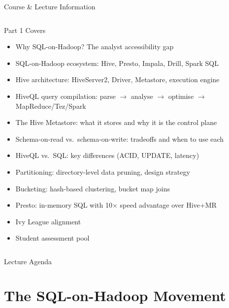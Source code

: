 \documentclass[aspectratio=169,10pt]{beamer}
\begin{document}
\begin{frame}{Course \& Lecture Information}
\begin{columns}[T]
      \begin{exampleblock}{Part 1 Covers}
        \begin{itemize}
          \item Why SQL-on-Hadoop? The analyst accessibility gap
          \item SQL-on-Hadoop ecosystem: Hive, Presto, Impala, Drill, Spark SQL
          \item Hive architecture: HiveServer2, Driver, Metastore, execution engine
          \item HiveQL query compilation: parse $\to$ analyse $\to$ optimise $\to$ MapReduce/Tez/Spark
          \item The Hive Metastore: what it stores and why it is the control plane
          \item Schema-on-read vs.\ schema-on-write: tradeoffs and when to use each
          \item HiveQL vs.\ SQL: key differences (ACID, UPDATE, latency)
          \item Partitioning: directory-level data pruning, design strategy
          \item Bucketing: hash-based clustering, bucket map joins
          \item Presto: in-memory SQL with 10$\times$ speed advantage over Hive+MR
          \item Ivy League alignment
          \item Student assessment pool
        \end{itemize}
      \end{exampleblock}
  \end{columns}
\end{frame}

\begin{frame}{Lecture Agenda}
  \tableofcontents
\end{frame}

\section{The SQL-on-Hadoop Movement}
\end{document}
